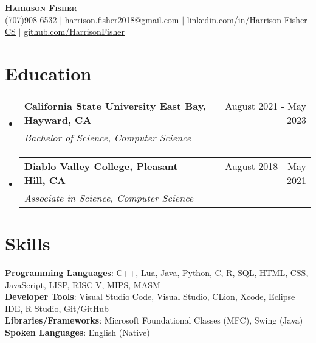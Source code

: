 \documentclass[letterpaper, 11pt]{article}
\makeatletter
\newcommand{\resumeSubheading}[4]{
  \vspace{-2pt}\item
    \begin{tabular*}{0.97\textwidth}[t]{l@{\extracolsep{\fill}}r}
      \textbf{#1} & #2 \\
      \textit{\small#3} & \textit{\small #4} \\
    \end{tabular*}\vspace{-7pt}
}
\newcommand{\resumeSubHeadingListStart}{\begin{itemize}[leftmargin=0.15in, label={}]}
\newcommand{\resumeSubHeadingListEnd}{\end{itemize}}
\makeatother
\begin{document}

\begin{center}
    \textbf{\Huge \scshape Harrison Fisher} \\ \vspace{7pt}
    \small (707)908-6532 $ | $ 
    \href{mailto:harrison.fisher2018@gmail.com}{\underline{harrison.fisher2018@gmail.com}} $ | $ 
    \href{https://www.linkedin.com/in/harrison-fisher-3838a3228/}{\underline{\faLinkedin \hspace{1pt} linkedin.com/in/Harrison-Fisher-CS}} $ | $
    \href{https://GitHub.com/HarrisonFisher}{\underline{\faGithub \hspace{1pt} github.com/HarrisonFisher}}
\end{center}




  

\section{Education}
  \resumeSubHeadingListStart
    \resumeSubheading
      {California State University East Bay, Hayward, CA}{August 2021 - May 2023}
      {Bachelor of Science, Computer Science}{}

    \resumeSubheading
      {Diablo Valley College, Pleasant Hill, CA}{August 2018 - May 2021}
      {Associate  in Science, Computer Science}{}
  \resumeSubHeadingListEnd
  
\section{Skills}
 \begin{itemize}[leftmargin=0.15in, label={}]
    \small{\item{
     \textbf{Programming Languages}{: C++, Lua, Java, Python, C, R, SQL, HTML, CSS, JavaScript, LISP, RISC-V, MIPS, MASM} \\
     \textbf{Developer Tools}{: Visual Studio Code, Visual Studio, CLion, Xcode, Eclipse IDE, R Studio, Git/GitHub} \\
     \textbf{Libraries/Frameworks}{: Microsoft Foundational Classes (MFC), Swing (Java)} \\
     \textbf{Spoken Languages}{: English (Native)} \\
    }}
 \end{itemize}
\end{document}
